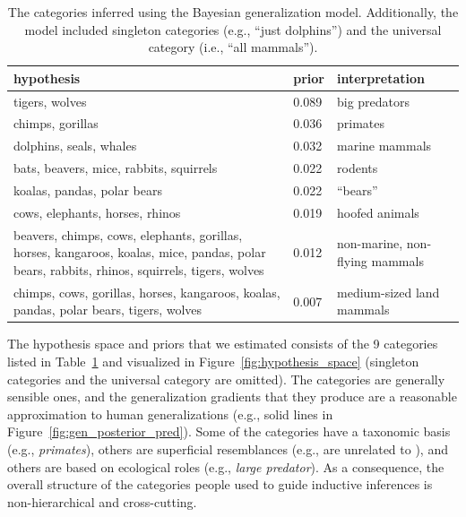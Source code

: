 \begin{table}[t]
\caption{The categories inferred using the Bayesian generalization model. Additionally, the model included singleton categories (e.g., ``just dolphins'') and the universal category (i.e., ``all mammals''). \vspace*{6pt}}
\begin{center}
\begin{tabular}{p{7cm} | l | p{3cm}}
\textbf{hypothesis}	&	\textbf{prior} &	\textbf{interpretation}	\\
\hline
tigers, wolves & 0.089 & big predators \vspace*{3pt}\\
chimps, gorillas & 0.036 & primates \\
dolphins, seals, whales & 0.032 & marine mammals \\
bats, beavers, mice, rabbits, squirrels & 0.022 & rodents \\
koalas, pandas, polar bears & 0.022 & ``bears'' \\
cows, elephants, horses, rhinos & 0.019 & hoofed animals \vspace*{3pt}\\ 
beavers, chimps, cows, elephants, gorillas, horses, kangaroos, koalas, mice, pandas, polar bears, rabbits, rhinos, squirrels, tigers, wolves\vspace*{3pt} & 0.012 & non-marine, non-flying mammals  \\
chimps, cows, gorillas, horses, kangaroos, koalas, pandas, polar bears, tigers, wolves & 0.007 & medium-sized land mammals \\
\hline
\end{tabular}
\end{center}
\label{table:hypothesis_space}
\end{table}


The hypothesis space and priors that we estimated consists of the 9 categories listed in Table~\ref{table:hypothesis_space} and visualized in Figure~\ref{fig:hypothesis_space} (singleton categories and the universal category are omitted). The categories are generally sensible ones, and the generalization gradients that they produce are a reasonable approximation to human generalizations (e.g., solid lines in Figure~\ref{fig:gen_posterior_pred}). Some of the categories have a taxonomic basis (e.g., {\it primates}), others are superficial resemblances (e.g.,  are unrelated to ), and others are based on ecological roles (e.g., {\it large predator}). As a consequence, the overall structure of the categories people used to guide inductive inferences is non-hierarchical and cross-cutting. 

